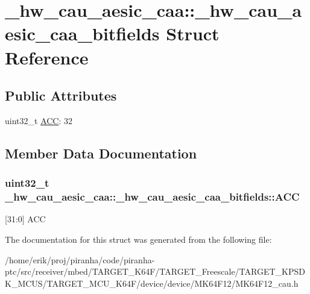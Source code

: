 \hypertarget{struct__hw__cau__aesic__caa_1_1__hw__cau__aesic__caa__bitfields}{}\section{\+\_\+hw\+\_\+cau\+\_\+aesic\+\_\+caa\+:\+:\+\_\+hw\+\_\+cau\+\_\+aesic\+\_\+caa\+\_\+bitfields Struct Reference}
\label{struct__hw__cau__aesic__caa_1_1__hw__cau__aesic__caa__bitfields}
\subsection*{Public Attributes}
\begin{DoxyCompactItemize}
\item 
uint32\+\_\+t \hyperlink{struct__hw__cau__aesic__caa_1_1__hw__cau__aesic__caa__bitfields_af201fc8b69c70fd5f28723415b2fdc9b}{A\+CC}\+: 32
\end{DoxyCompactItemize}


\subsection{Member Data Documentation}
\subsubsection[{\texorpdfstring{A\+CC}{ACC}}]{\setlength{\rightskip}{0pt plus 5cm}uint32\+\_\+t \+\_\+hw\+\_\+cau\+\_\+aesic\+\_\+caa\+::\+\_\+hw\+\_\+cau\+\_\+aesic\+\_\+caa\+\_\+bitfields\+::\+A\+CC}\hypertarget{struct__hw__cau__aesic__caa_1_1__hw__cau__aesic__caa__bitfields_af201fc8b69c70fd5f28723415b2fdc9b}{}\label{struct__hw__cau__aesic__caa_1_1__hw__cau__aesic__caa__bitfields_af201fc8b69c70fd5f28723415b2fdc9b}
\mbox{[}31\+:0\mbox{]} A\+CC 

The documentation for this struct was generated from the following file\+:\begin{DoxyCompactItemize}
\item 
/home/erik/proj/piranha/code/piranha-\/ptc/src/receiver/mbed/\+T\+A\+R\+G\+E\+T\+\_\+\+K64\+F/\+T\+A\+R\+G\+E\+T\+\_\+\+Freescale/\+T\+A\+R\+G\+E\+T\+\_\+\+K\+P\+S\+D\+K\+\_\+\+M\+C\+U\+S/\+T\+A\+R\+G\+E\+T\+\_\+\+M\+C\+U\+\_\+\+K64\+F/device/device/\+M\+K64\+F12/M\+K64\+F12\+\_\+cau.\+h\end{DoxyCompactItemize}
